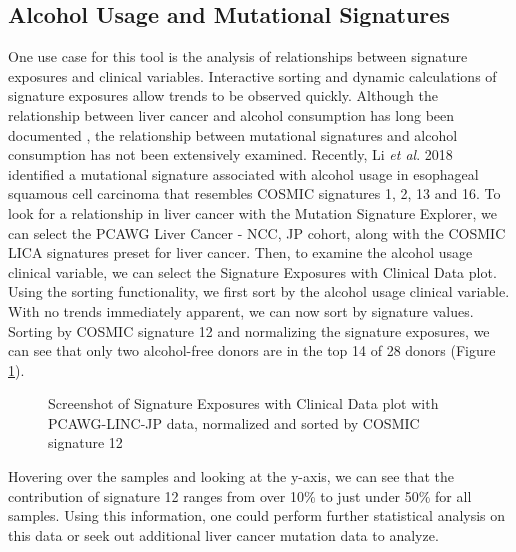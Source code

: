 \documentclass[12pt, letterpaper]{article}
\begin{document}
\subsection{Alcohol Usage and Mutational Signatures}
One use case for this tool is the analysis of relationships between signature exposures and clinical variables.
Interactive sorting and dynamic calculations of signature exposures allow trends to be observed quickly.
Although the relationship between liver cancer and alcohol consumption has long been documented \cite{bosch2004primary}, the relationship between mutational signatures and alcohol consumption has not been extensively examined.
Recently, Li \textit{et al}. 2018 identified a mutational signature associated with alcohol usage in esophageal squamous cell carcinoma that resembles COSMIC signatures 1, 2, 13 and 16\cite{li2018mutational}.
To look for a relationship in liver cancer with the Mutation Signature Explorer, we can select the PCAWG Liver Cancer - NCC, JP cohort, along with the COSMIC LICA signatures preset for liver cancer. 
Then, to examine the alcohol usage clinical variable, we can select the Signature Exposures with Clinical Data plot.
Using the sorting functionality, we first sort by the alcohol usage clinical variable.
With no trends immediately apparent, we can now sort by signature values.
Sorting by COSMIC signature 12 and normalizing the signature exposures, we can see that only two alcohol-free donors are in the top 14 of 28 donors (Figure \ref{fig:caseStudy1_sig12}).
\begin{figure}[h]
    \centering
    \caption{Screenshot of Signature Exposures with Clinical Data plot with PCAWG-LINC-JP data, normalized and sorted by COSMIC signature 12}
    \label{fig:caseStudy1_sig12}
\end{figure}
Hovering over the samples and looking at the y-axis, we can see that the contribution of signature 12 ranges from over 10\% to just under 50\% for all samples.
Using this information, one could perform further statistical analysis on this data or seek out additional liver cancer mutation data to analyze.
\end{document}
